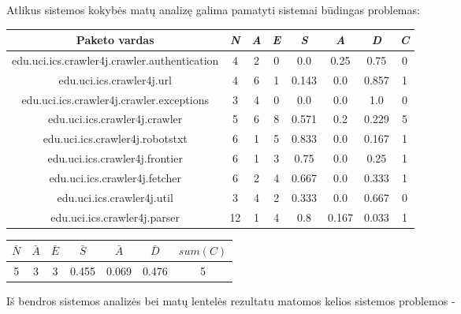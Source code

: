 Atlikus sistemos kokybės matų analizę galima pamatyti sistemai būdingas problemas:
\begin{center}
    \begin{tabular}{|c|c|c|c|c|c|c|c|}
        \hline
        Paketo vardas & \textit{N} & \textit{A} & \textit{E} & \textit{S} & \textit{A} & \textit{D} & \textit{C} \\ [0.5ex]
        \hline\hline
        edu.uci.ics.crawler4j.crawler.authentication & 4 & 2 & 0 & 0.0 & 0.25 & 0.75 & 0\\
        \hline
        edu.uci.ics.crawler4j.url & 4 & 6 & 1 & 0.143 & 0.0 & 0.857 & 1 \\
        \hline
        edu.uci.ics.crawler4j.crawler.exceptions & 3 & 4 & 0 & 0.0 & 0.0 & 1.0 & 0\\
        \hline
        edu.uci.ics.crawler4j.crawler & 5 & 6 & 8 & 0.571 & 0.2 & 0.229 & 5 \\
        \hline
        edu.uci.ics.crawler4j.robotstxt & 6 & 1 & 5 & 0.833 & 0.0 & 0.167 & 1 \\
        \hline
        edu.uci.ics.crawler4j.frontier & 6 & 1 & 3 & 0.75 & 0.0 & 0.25 & 1 \\
        \hline
        edu.uci.ics.crawler4j.fetcher & 6 & 2 & 4 & 0.667 & 0.0 & 0.333 & 1 \\
        \hline
        edu.uci.ics.crawler4j.util & 3 & 4 & 2 & 0.333 & 0.0 & 0.667 & 0 \\
        \hline
        edu.uci.ics.crawler4j.parser & 12 & 1 & 4 & 0.8 & 0.167 & 0.033 & 1 \\
        \hline
    \end{tabular}
    \begin{tabular}{|c|c|c|c|c|c|c|}
        \hline
        $\bar{N}$ & $\bar{A}$ & $\bar{E}$ & $\bar{S}$ & $\bar{A}$ & $\bar{D}$ & $sum(C)$ \\ [0.5ex]
        \hline\hline
        5 & 3 & 3 & 0.455 & 0.069 & 0.476 & 5\\
        \hline
    \end{tabular}
\end{center}
Iš bendros sistemos analizės bei matų lentelės rezultatu matomos kelios sistemos problemos -
